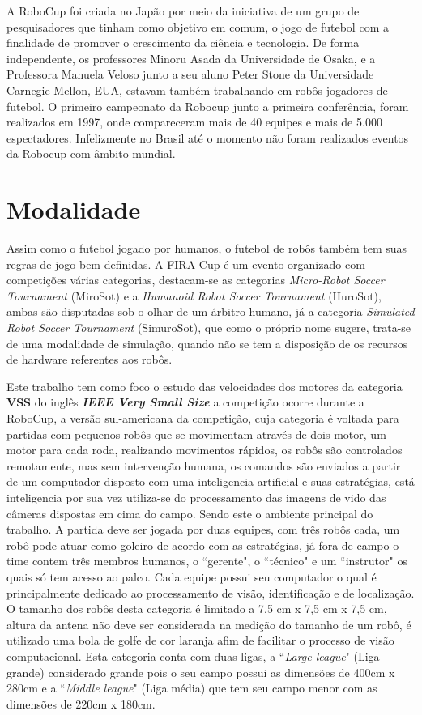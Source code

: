 \documentclass[a4paper,12pt,portuguese]{ufms-cpcx}
\begin{document}
A RoboCup foi criada no Japão por meio da iniciativa de um grupo de pesquisadores que tinham como objetivo em comum, o jogo de futebol com a finalidade de promover o crescimento da ciência e tecnologia. De forma independente, os professores Minoru Asada da Universidade de Osaka, e a Professora Manuela Veloso junto a seu aluno Peter Stone da Universidade Carnegie Mellon, EUA, estavam também trabalhando em robôs jogadores de futebol.
O primeiro campeonato da Robocup junto a primeira conferência, foram realizados em 1997, onde compareceram mais de 40 equipes e mais de 5.000 espectadores. Infelizmente no Brasil até o momento não foram realizados eventos da Robocup com âmbito mundial.

\section{Modalidade} \label{modalidade}
Assim como o futebol jogado por humanos, o futebol de robôs também tem suas regras de jogo bem definidas. A FIRA Cup é um evento organizado com competições várias categorias, destacam-se as categorias \textit{Micro-Robot Soccer Tournament} (MiroSot) e a \textit{Humanoid Robot Soccer Tournament} (HuroSot), ambas são disputadas sob o olhar de um árbitro humano, já a categoria \textit{Simulated Robot Soccer Tournament} (SimuroSot), que como o próprio nome sugere, trata-se de uma modalidade de simulação, quando não se tem a disposição de os recursos de hardware referentes aos robôs.
 
Este trabalho tem como foco o estudo das velocidades dos motores da categoria \textbf{VSS} do inglês \textit{\textbf{IEEE Very Small Size}} a competição ocorre durante a RoboCup, a versão sul-americana da competição, cuja categoria é voltada para partidas com pequenos robôs que se movimentam através de dois motor, um motor para cada roda, realizando movimentos rápidos, os robôs são controlados remotamente, mas sem intervenção humana, os comandos são enviados a partir de um computador disposto com uma inteligencia artificial e suas estratégias, está inteligencia por sua vez utiliza-se do processamento das imagens de vido das câmeras dispostas em cima do campo. Sendo este o ambiente principal do trabalho.
A partida deve ser jogada por duas equipes, com três robôs cada, um robô pode atuar como goleiro de acordo com as estratégias, já fora de campo o time contem três membros humanos, o ``gerente", o ``técnico" e um ``instrutor" os quais só tem acesso ao palco. Cada equipe possui seu computador o qual é principalmente dedicado ao processamento de visão, identificação e de localização.  
O tamanho dos robôs desta categoria é limitado a 7,5 cm x 7,5 cm x 7,5 cm, altura da antena não deve ser considerada na medição do tamanho de um robô, é utilizado uma bola de golfe de cor laranja afim de facilitar o processo de visão computacional.
Esta categoria conta com duas ligas, a ``\textit{Large league}" (Liga grande) considerado grande pois o seu campo possui as dimensões de 400cm x 280cm e a ``\textit{Middle league}" (Liga média) que tem seu campo menor com as dimensões de 220cm x 180cm.
\end{document}

